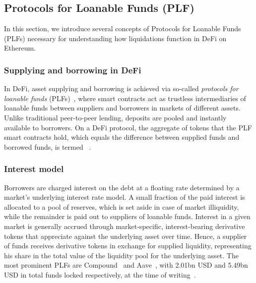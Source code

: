\subsection{Protocols for Loanable Funds (PLF)}
\label{sec:5b:plfs}
In this section, we introduce several concepts of Protocols for Loanable Funds (PLFs) necessary for understanding how liquidations function in DeFi on Ethereum.

\subsubsection{Supplying and borrowing in DeFi}
In DeFi, asset supplying and borrowing is achieved via so-called \textit{protocols for loanable funds} (PLFs)~\cite{10.1145/3419614.3423254}, where smart contracts act as trustless intermediaries of loanable funds between suppliers and borrowers in markets of different assets.
Unlike traditional peer-to-peer lending, deposits are pooled and instantly available to borrowers.
On a DeFi protocol, the aggregate of tokens that the PLF smart contracts hold, which equals the difference between supplied funds and borrowed funds, is termed ~\cite{defi-llama}.

\subsubsection{Interest model}
Borrowers are charged interest on the debt at a floating rate determined by a market's underlying interest rate model.
A small fraction of the paid interest is allocated to a pool of reserves, which is set aside in case of market illiquidity, while the remainder is paid out to suppliers of loanable funds.
Interest in a given market is generally accrued through market-specific, interest-bearing derivative tokens that appreciate against the underlying asset over time.
Hence, a supplier of funds receives derivative tokens in exchange for supplied liquidity, representing his share in the total value of the liquidity pool for the underlying asset.
The most prominent PLFs are Compound~\cite{web:compoundfinance} and Aave~\cite{web:aave}, with 2.01bn USD and 5.49bn USD in total funds locked respectively, at the time of writing~\cite{defi-llama}.

